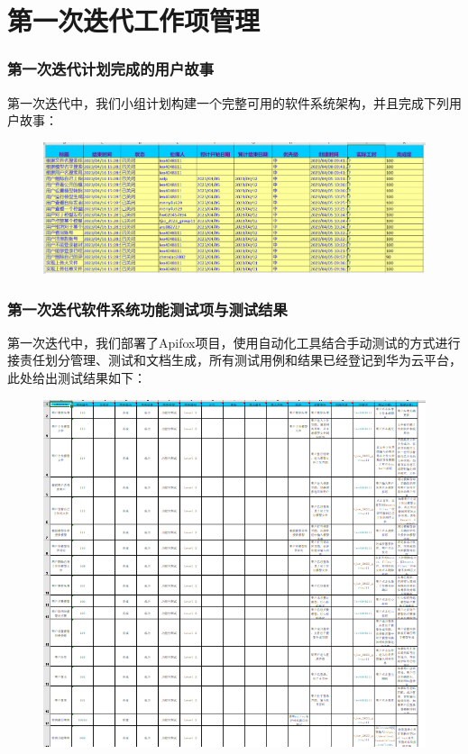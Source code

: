 \section{第一次迭代工作项管理}
\begin{frame}
    \frametitle{第一次迭代计划完成的用户故事}
    第一次迭代中，我们小组计划构建一个完整可用的软件系统架构，并且完成下列用户故事：
    \begin{figure}[H]
        \centering
        \includegraphics[width=\textwidth]{contents/figure/iteration1_stories.png}
    \end{figure}
\end{frame}

\begin{frame}
    \frametitle{第一次迭代软件系统功能测试项与测试结果}
    第一次迭代中，我们部署了Apifox项目，使用自动化工具结合手动测试的方式进行接责任划分管理、测试和文档生成，所有测试用例和结果已经登记到华为云平台，此处给出测试结果如下：
    \begin{figure}[H]
        \centering
        \includegraphics[width=\textwidth]{contents/figure/testcases.png}
    \end{figure}
\end{frame}


